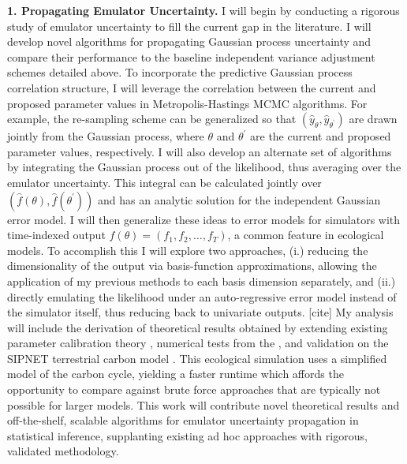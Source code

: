 \documentclass[12pt]{article}
\begin{document}
 \textbf{1. Propagating Emulator Uncertainty.} I will begin by conducting a rigorous study of emulator uncertainty to fill the current gap in the literature. I will develop novel algorithms for propagating Gaussian process uncertainty and compare their performance to the baseline independent variance adjustment schemes detailed above. To incorporate the predictive Gaussian process correlation structure, I will leverage the correlation between the current and proposed parameter values in Metropolis-Hastings MCMC algorithms. For example, the re-sampling scheme \cite{Fer} can be generalized so that 
 $(\hat{y}_{\theta}, \hat{y}_{\theta^\prime})$ are drawn jointly from the Gaussian process, where $\theta$ and $\theta^\prime$ are the current and proposed parameter values, respectively. I will also develop an alternate set of algorithms by integrating the Gaussian process out of the likelihood, thus averaging over the emulator uncertainty. This integral can be calculated jointly over $(\hat{f}(\theta), \hat{f}(\theta^\prime))$ and has an analytic solution for the independent Gaussian error model. I will then generalize these ideas to error models for simulators with time-indexed output $f(\theta) = (f_1, f_2, \dots, f_T)$, a common feature in ecological models. To accomplish this I will explore two approaches, (i.) reducing the dimensionality of the output via basis-function 
 approximations, allowing the application of my previous methods to each basis dimension separately, and (ii.) directly emulating the likelihood under an auto-regressive error model instead of the simulator itself, thus reducing back to univariate outputs. [cite]
 My analysis will include the derivation of theoretical results obtained by extending existing parameter calibration theory \cite{Tuo}, numerical tests from the 
  \cite{Surjanovic}, and validation on the SIPNET terrestrial carbon model \cite{Fer}. This ecological simulation uses a simplified model of the carbon cycle, yielding a faster runtime which affords the opportunity to compare against brute force approaches that are typically not possible for larger models. This work will contribute novel theoretical results and off-the-shelf, scalable algorithms for emulator uncertainty propagation in statistical inference, supplanting existing ad hoc approaches with rigorous, validated methodology. 
\end{document}
